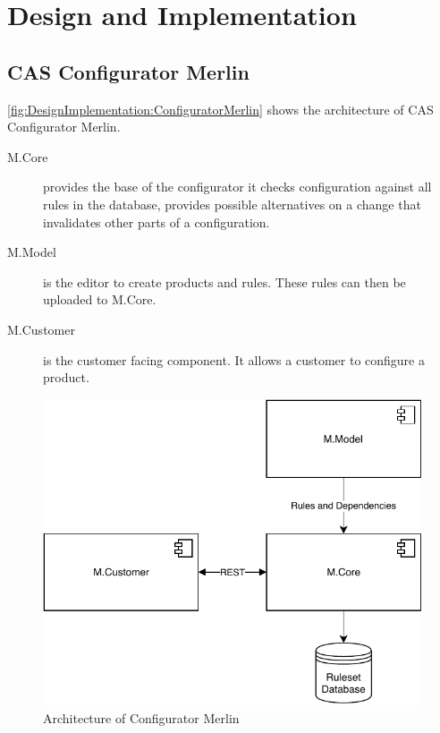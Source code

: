 \chapter{Design and Implementation}
\label{ch:DesignImplementation}


\section{CAS Configurator Merlin}
\label{sec:DesignImplementation:ConfiguratorMerlin}

\autoref{fig:DesignImplementation:ConfiguratorMerlin} shows the architecture of CAS Configurator Merlin.
\begin{description}
    \item[M.Core] provides the base of the configurator it checks configuration against all rules in the database, provides possible alternatives on a change that invalidates other parts of a configuration.
    \item[M.Model] is the editor to create products and rules. These rules can then be uploaded to M.Core.
    \item[M.Customer] is the customer facing component. It allows a customer to configure a product.
\end{description}

\begin{figure}
    \centering
    \includegraphics{./figures/MerlinConfigurator.pdf}
    \caption{Architecture of Configurator Merlin \cite[Fig. 4.1]{raabKollaborativeProduktkonfigurationEchtzeit2019}}
    \label{fig:DesignImplementation:ConfiguratorMerlin}
\end{figure}

